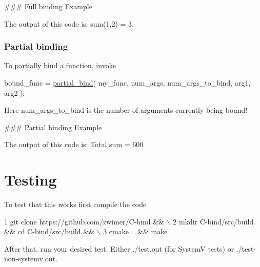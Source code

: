\#\#\# Full binding Example 
 The output of this code is\+: {\ttfamily sum(1,2) = 3}.

\subsubsection*{Partial binding}

To partially bind a function, invoke 
\begin{DoxyCode}
bound\_func = \hyperlink{bind_8c_a187e674be73b611c4e8d97345192757a}{partial\_bind}( my\_func, num\_args, num\_args\_to\_bind, arg1, arg2 );
\end{DoxyCode}
 Here {\ttfamily num\+\_\+args\+\_\+to\+\_\+bind} is the number of arguments currently being bound!

\#\#\# Partial binding Example 
 The output of this code is\+: {\ttfamily Total sum = 600} 



\section*{Testing}

To test that this works first compile the code 
\begin{DoxyCode}
1 git clone https://github.com/zwimer/C-bind && \(\backslash\)
2 mkdir C-bind/src/build && cd C-bind/src/build && \(\backslash\)
3 cmake .. && make
\end{DoxyCode}


After that, run your desired test. Either {\ttfamily ./test.out} (for SystemV tests) or {\ttfamily ./test-\/non-\/systemv.out}.

